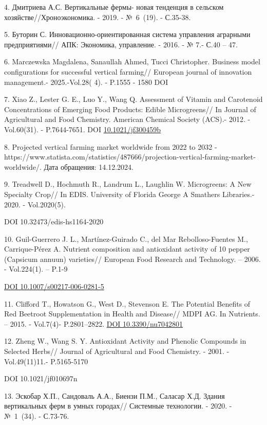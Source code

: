 4. Дмитриева А.С. Вертикальные фермы- новая тенденция в сельском
хозяйстве//Хроноэкономика. - 2019. - №~6~(19). - С.35-38.

5. Буторин С. Инновационно-ориентированная система управления аграрными
предприятиями// АПК: Экономика, управление. - 2016. - № 7.- С.40 -- 47.

6. Marczewska Magdalena, Sanaullah Ahmed, Tucci Christopher. Business
model configurations for successful vertical farming// European journal
of innovation management.- 2025.-Vol.28( 4). - P.1555 - 1580 DOI
\href{http://dx.doi.org/10.1108/EJIM-01-2023-0017}{}

7. Xiao Z., Lester G. E., Luo Y., Wang Q. Assessment of Vitamin and
Carotenoid Concentrations of Emerging Food Products: Edible
Microgreens// In Journal of Agricultural and Food Chemistry. American
Chemical Society (ACS).- 2012. -Vol.60(31). - P.7644-7651. DOI
\href{https://doi.org/10.1021/jf300459b}{10.1021/jf300459b}

8. Projected vertical farming market worldwide from 2022 to 2032 -
https://www.statista.com/statistics/487666/projection-vertical-farming-market-worldwide/.
Дата обращения: 14.12.2024.

9. Treadwell D., Hochmuth R., Landrum L., Laughlin W. Microgreens: A New
Specialty Crop// In EDIS. University of Florida George A Smathers
Libraries.- 2020. - Vol.2020(5).

DOI 10.32473/edis-hs1164-2020

10. Guil-Guerrero J. L., Martínez-Guirado C., del Mar Rebolloso-Fuentes
M., Carrique-Pérez A. Nutrient composition and antioxidant activity of
10 pepper (Capsicum annuun) varieties// European Food Research and
Technology. -- 2006. - Vol.224(1). -- P.1-9

\href{https://doi.org/10.1007/s00217-006-0281-5}{DOI
10.1007/s00217-006-0281-5}

11. Clifford T., Howatson G., West D., Stevenson E. The Potential
Benefits of Red Beetroot Supplementation in Health and Disease// MDPI
AG. In Nutrients. -- 2015. - Vol.7(4)- P.2801--2822.
\href{https://doi.org/10.3390/nu7042801}{DOI 10.3390/nu7042801}

12. Zheng W., Wang S. Y. Antioxidant Activity and Phenolic Compounds in
Selected Herbs// Journal of Agricultural and Food Chemistry. - 2001. -
Vol.49(11)11.- P.5165-5170

DOI 10.1021/jf010697n

13. Эскобар Х.П., Сандоваль А.А., Биензи П.М., Саласар Х.Д. Здания
вертикальных ферм в умных городах// Системные технологии. - 2020. -
№~1~(34). - С.73-76.

